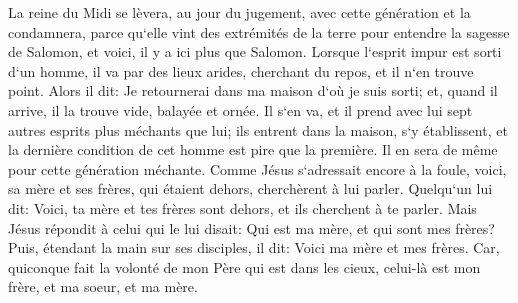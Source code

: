 \verse La reine du Midi se lèvera, au jour du jugement, avec cette génération et la condamnera, parce qu`elle vint des extrémités de la terre pour entendre la sagesse de Salomon, et voici, il y a ici plus que Salomon. 
\verse Lorsque l`esprit impur est sorti d`un homme, il va par des lieux arides, cherchant du repos, et il n`en trouve point. 
\verse Alors il dit: Je retournerai dans ma maison d`où je suis sorti; et, quand il arrive, il la trouve vide, balayée et ornée. 
\verse Il s`en va, et il prend avec lui sept autres esprits plus méchants que lui; ils entrent dans la maison, s`y établissent, et la dernière condition de cet homme est pire que la première. Il en sera de même pour cette génération méchante. 
\verse Comme Jésus s`adressait encore à la foule, voici, sa mère et ses frères, qui étaient dehors, cherchèrent à lui parler. 
\verse Quelqu`un lui dit: Voici, ta mère et tes frères sont dehors, et ils cherchent à te parler. 
\verse Mais Jésus répondit à celui qui le lui disait: Qui est ma mère, et qui sont mes frères? 
\verse Puis, étendant la main sur ses disciples, il dit: Voici ma mère et mes frères. 
\verse Car, quiconque fait la volonté de mon Père qui est dans les cieux, celui-là est mon frère, et ma soeur, et ma mère. 

